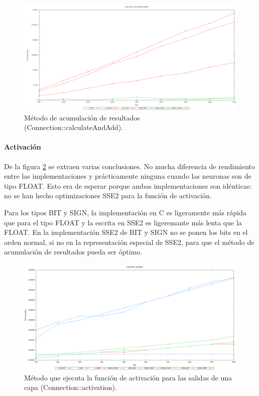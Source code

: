 \documentclass[11pt]{article}
\begin{document}
\begin{titlepage}
\begin{figure}[htb]
\centering
\includegraphics[width=\textwidth]{./img/Connection_calculateAndAddTo.png}
\caption{\label{grafImplCalculate}Método de acumulación de resultados (Connection::calculateAndAdd).}
\end{figure}
\newpage
\paragraph{Activación}
\label{sec-6-1-1-2}


De la figura \ref{grafImplActivation} se extraen varias conclusiones. No mucha diferencia de rendimiento entre las implementaciones y prácticamente ninguna cuando las neuronas son de tipo FLOAT. Esto era de esperar porque ambas implementaciones son idénticas: no se han hecho optimizaciones SSE2 para la función de activación.

Para los tipos BIT y SIGN, la implementación en C es ligeramente más rápida que para el tipo FLOAT y la  escrita en SSE2 es ligeremante más lenta que la FLOAT. En la implementación SSE2 de BIT y SIGN no se ponen los bits en el orden normal, si no en la representación especial de SSE2, para que el método de acumulación de resultados pueda ser óptimo.

\begin{figure}[htb]
\centering
\includegraphics[width=\textwidth]{./img/Connection_activation.png}
\caption{\label{grafImplActivation}Método que ejecuta la función de activación para las salidas de una capa (Connection::activation).}
\end{figure}
\newpage

\end{titlepage}
\end{document}
